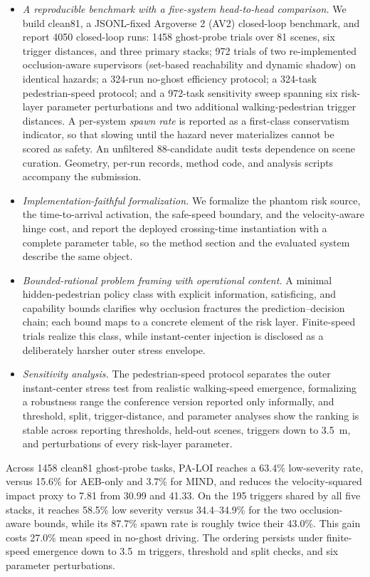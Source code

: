 \documentclass[journal]{IEEEtran}
\begin{document}
\begin{itemize}
  \item \emph{A reproducible benchmark with a five-system head-to-head comparison.} We build clean81, a JSONL-fixed Argoverse 2 (AV2) closed-loop benchmark, and report 4050 closed-loop runs: 1458 ghost-probe trials over 81 scenes, six trigger distances, and three primary stacks; 972 trials of two re-implemented occlusion-aware supervisors (set-based reachability and dynamic shadow) on identical hazards; a 324-run no-ghost efficiency protocol; a 324-task pedestrian-speed protocol; and a 972-task sensitivity sweep spanning six risk-layer parameter perturbations and two additional walking-pedestrian trigger distances. A per-system \emph{spawn rate} is reported as a first-class conservatism indicator, so that slowing until the hazard never materializes cannot be scored as safety. An unfiltered 88-candidate audit tests dependence on scene curation. Geometry, per-run records, method code, and analysis scripts accompany the submission.
  \item \emph{Implementation-faithful formalization.} We formalize the phantom risk source, the time-to-arrival activation, the safe-speed boundary, and the velocity-aware hinge cost, and report the deployed crossing-time instantiation with a complete parameter table, so the method section and the evaluated system describe the same object.
  \item \emph{Bounded-rational problem framing with operational content.} A minimal hidden-pedestrian policy class with explicit information, satisficing, and capability bounds clarifies why occlusion fractures the prediction--decision chain; each bound maps to a concrete element of the risk layer. Finite-speed trials realize this class, while instant-center injection is disclosed as a deliberately harsher outer stress envelope.
  \item \emph{Sensitivity analysis.} The pedestrian-speed protocol separates the outer instant-center stress test from realistic walking-speed emergence, formalizing a robustness range the conference version reported only informally, and threshold, split, trigger-distance, and parameter analyses show the ranking is stable across reporting thresholds, held-out scenes, triggers down to \SI{3.5}{m}, and perturbations of every risk-layer parameter.
\end{itemize}

Across 1458 clean81 ghost-probe tasks, PA-LOI reaches a 63.4\% low-severity rate, versus 15.6\% for AEB-only and 3.7\% for MIND, and reduces the velocity-squared impact proxy to 7.81 from 30.99 and 41.33. On the 195 triggers shared by all five stacks, it reaches 58.5\% low severity versus 34.4--34.9\% for the two occlusion-aware bounds, while its 87.7\% spawn rate is roughly twice their 43.0\%. This gain costs 27.0\% mean speed in no-ghost driving. The ordering persists under finite-speed emergence down to \SI{3.5}{m} triggers, threshold and split checks, and six parameter perturbations.
\end{document}
